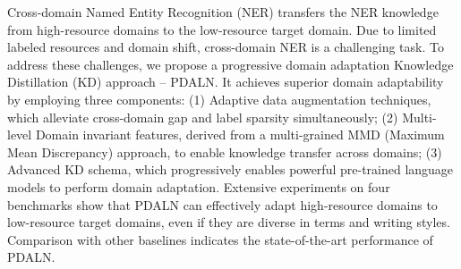 Cross-domain Named Entity Recognition (NER) transfers the NER knowledge from high-resource domains to the low-resource target domain. Due to limited labeled resources and domain shift, cross-domain NER is a challenging task. To address these challenges, we propose a progressive domain adaptation Knowledge Distillation (KD) approach -- PDALN.  It achieves superior domain adaptability by employing three components: (1) Adaptive data augmentation techniques, which alleviate cross-domain gap and label sparsity simultaneously; (2) Multi-level Domain invariant features, derived from a multi-grained MMD (Maximum Mean Discrepancy) approach, to enable knowledge transfer across domains; (3) Advanced KD schema, which progressively enables powerful pre-trained language models to perform domain adaptation. Extensive experiments on four benchmarks show that PDALN can effectively adapt high-resource domains to low-resource target domains, even if they are diverse in terms and writing styles. Comparison with other baselines indicates the state-of-the-art performance of PDALN.
